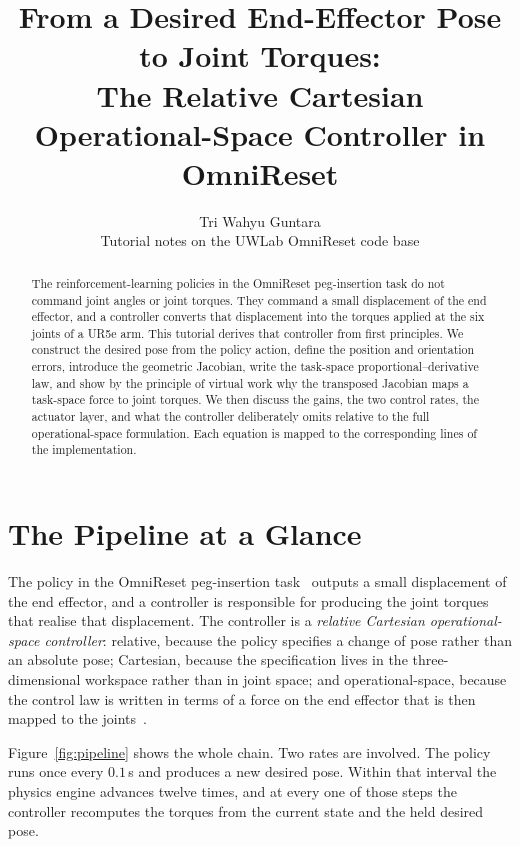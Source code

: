 \documentclass{article}
\title{From a Desired End-Effector Pose to Joint Torques:\\ The Relative Cartesian Operational-Space Controller in OmniReset}
\author{
  Tri Wahyu Guntara\\
  Tutorial notes on the UWLab OmniReset code base\\
}
\begin{document}
\maketitle

\begin{abstract}
The reinforcement-learning policies in the OmniReset peg-insertion task do not command joint angles or joint torques. They command a small displacement of the end effector, and a controller converts that displacement into the torques applied at the six joints of a UR5e arm. This tutorial derives that controller from first principles. We construct the desired pose from the policy action, define the position and orientation errors, introduce the geometric Jacobian, write the task-space proportional--derivative law, and show by the principle of virtual work why the transposed Jacobian maps a task-space force to joint torques. We then discuss the gains, the two control rates, the actuator layer, and what the controller deliberately omits relative to the full operational-space formulation. Each equation is mapped to the corresponding lines of the implementation.
\end{abstract}


\section{The Pipeline at a Glance}
\label{sec:overview}

The policy in the OmniReset peg-insertion task~\cite{omnireset2026} outputs a small displacement of the end effector, and a controller is responsible for producing the joint torques that realise that displacement. The controller is a \emph{relative Cartesian operational-space controller}: relative, because the policy specifies a change of pose rather than an absolute pose; Cartesian, because the specification lives in the three-dimensional workspace rather than in joint space; and operational-space, because the control law is written in terms of a force on the end effector that is then mapped to the joints~\cite{khatib1987unified}.

Figure~\ref{fig:pipeline} shows the whole chain. Two rates are involved. The policy runs once every $0.1$\,s and produces a new desired pose. Within that interval the physics engine advances twelve times, and at every one of those steps the controller recomputes the torques from the current state and the held desired pose.
\end{document}
